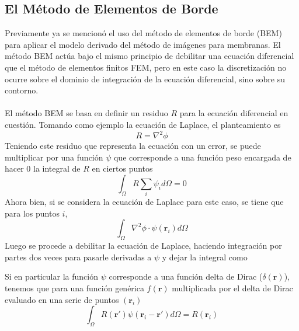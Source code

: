 \documentclass[12pt, notitlepage]{article}
\begin{document}
\subsection{El Método de Elementos de Borde}
Previamente ya se mencionó el uso del método de elementos de borde (BEM) para aplicar el modelo derivado del método de imágenes para membranas. El método BEM actúa bajo el mismo principio de debilitar una ecuación diferencial que el método de elementos finitos FEM, pero en este caso la discretización no ocurre sobre el dominio de integración de la ecuación diferencial, sino sobre su contorno.\\\\
El método BEM se basa en definir un residuo $R$ para la ecuación diferencial en cuestión. Tomando como ejemplo la ecuación de Laplace, el planteamiento es
\begin{equation}
R = \nabla^2\phi
\end{equation}
Teniendo este residuo que representa la ecuación con un error, se puede multiplicar por una función $\psi$ que corresponde a una función peso encargada de hacer 0 la integral de $R$ en ciertos puntos
\begin{equation}
\int_\Omega R\sum_i\psi_i d\Omega = 0
\end{equation}
Ahora bien, si se considera la ecuación de Laplace para este caso, se tiene que para los puntos $i$,
\begin{equation}
\int_\Omega \nabla^2\phi\cdot\psi(\mathbf{r}_i) d\Omega
\end{equation}
Luego se procede a debilitar la ecuación de Laplace, haciendo integración por partes dos veces para pasarle derivadas a $\psi$ y dejar la integral como
\begin{equation}

\end{equation}


Si en particular la función $\psi$ corresponde a una función delta de Dirac ($\delta(\mathbf{r})$), tenemos que para una función genérica $f(\mathbf{r})$ multiplicada por el delta de Dirac evaluado en una serie de puntos $(\mathbf{r}_i)$
\begin{equation}
\int_\Omega R(\mathbf{r}')\psi(\mathbf{r}_i - \mathbf{r}')d\Omega = R(\mathbf{r}_i)
\end{equation}



\end{document}
